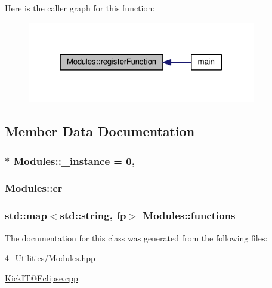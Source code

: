 Here is the caller graph for this function\+:\nopagebreak
\begin{figure}[H]
\begin{center}
\leavevmode
\includegraphics[width=283pt]{class_modules_a01735870f0eb88e2847a822be229f927_icgraph}
\end{center}
\end{figure}




\subsection{Member Data Documentation}
\subsubsection[{\texorpdfstring{\+\_\+instance}{_instance}}]{ $\ast$ Modules\+::\+\_\+instance = 0\hspace{0.3cm}{\ttfamily [static]}, {\ttfamily [protected]}}\hypertarget{class_modules_ad82835853c834bfec3aa53da4b75def4}{}\label{class_modules_ad82835853c834bfec3aa53da4b75def4}
\subsubsection[{\texorpdfstring{cr}{cr}}]{ Modules\+::cr\hspace{0.3cm}{\ttfamily [protected]}}\hypertarget{class_modules_a26598b42bad97f63a6662078afb61af4}{}\label{class_modules_a26598b42bad97f63a6662078afb61af4}
\subsubsection[{\texorpdfstring{functions}{functions}}]{\setlength{\rightskip}{0pt plus 5cm}std\+::map$<$std\+::string, {\bf fp}$>$ Modules\+::functions\hspace{0.3cm}{\ttfamily [protected]}}\hypertarget{class_modules_a96b175e7cd625d536d12f9c5e4aa8318}{}\label{class_modules_a96b175e7cd625d536d12f9c5e4aa8318}


The documentation for this class was generated from the following files\+:\begin{DoxyCompactItemize}
\item 
4\+\_\+\+Utilities/\hyperlink{_modules_8hpp}{Modules.\+hpp}\item 
\hyperlink{_kick_i_t_0D_eclipse_8cpp}{Kick\+I\+T@\+Eclipse.\+cpp}\end{DoxyCompactItemize}
